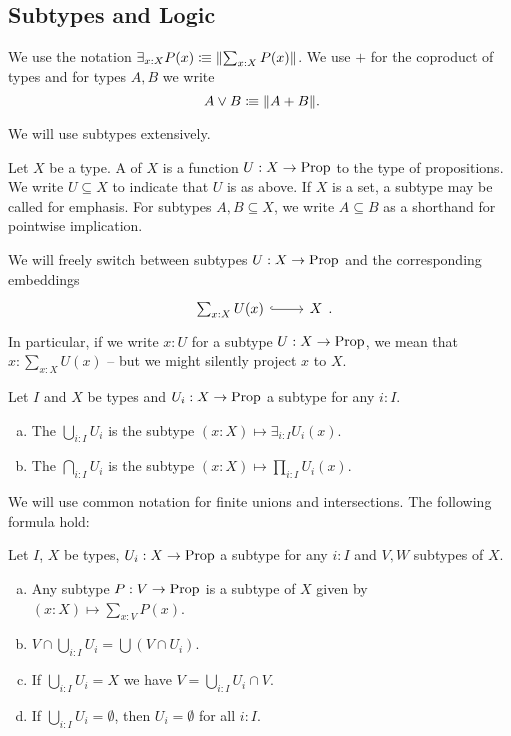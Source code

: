 \subsection{Subtypes and Logic}

We use the notation $\exists_{x:X}P(x)\vcentcolon\mspace{-1.2mu}\equiv \lVert \sum_{x:X}P(x) \rVert$.
We use $+$ for the coproduct of types and for types $A,B$ we write
\[ A\vee B\colonequiv \propTrunc{ A+B }\rlap{.}\]

We will use subtypes extensively.

\begin{definition}
  \index{$\subseteq$}
  Let $X$ be a type.
  A  of $X$ is a function $U:X\to\mathrm{Prop}$ to the type of propositions.
  We write $U\subseteq X$ to indicate that $U$ is as above.
  If $X$ is a set, a subtype may be called  for emphasis.
  For subtypes $A,B\subseteq X$, we write $A\subseteq B$ as a shorthand for pointwise implication.
\end{definition}

We will freely switch between subtypes $U:X\to\mathrm{Prop}$ and the corresponding embeddings
\[
  \begin{tikzcd}
    \sum_{x:X}U(x) \ar[r,hook] & X
  \end{tikzcd}
  \rlap{.}
\]
In particular, if we write $x:U$ for a subtype $U:X\to\mathrm{Prop}$, we mean that $x:\sum_{x:X}U(x)$ -- but we might silently project $x$ to $X$.

\begin{definition}
  Let $I$ and $X$ be types and $U_i:X\to\mathrm{Prop}$ a subtype for any $i:I$.
  \begin{enumerate}[(a)]
  \item The  $\bigcup_{i:I}U_i$ is the subtype $(x:X)\mapsto \exists_{i:I}U_i(x)$.
  \item The  $\bigcap_{i:I}U_i$ is the subtype $(x:X)\mapsto\prod_{i:I}U_i(x)$.
  \end{enumerate}
\end{definition}

We will use common notation for finite unions and intersections.
The following formula hold:

\begin{lemma}
  Let $I$, $X$ be types, $U_i:X\to\mathrm{Prop}$ a subtype for any $i:I$ and $V,W$ subtypes of $X$.
  \begin{enumerate}[(a)]
  \item Any subtype $P:V\to\mathrm{Prop}$ is a subtype of $X$ given by $(x:X)\mapsto\sum_{x:V}P(x)$.
  \item $V\cap \bigcup_{i:I} U_i=\bigcup (V\cap U_i)$.
  \item If $\bigcup_{i:I}U_i=X$ we have $V=\bigcup_{i:I}U_i\cap V$.
  \item If $\bigcup_{i:I}U_i=\emptyset$, then $U_i=\emptyset$ for all $i:I$.
  \end{enumerate}
\end{lemma}


